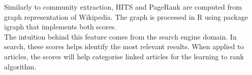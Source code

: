 Similarly to community extraction, HITS and PageRank are computed from graph representation of Wikipedia. The graph is processed in R using package igraph that implements both scores. \\

The intuition behind this feature comes from the search engine domain. In search, these scores helps identify the most relevant results. When applied to articles, the scores will help categorise linked articles for the learning to rank algorithm.
